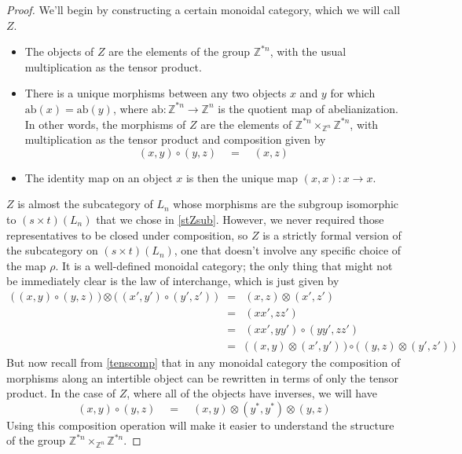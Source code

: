 \documentclass{amsbook} %
\numberwithin{section}{chapter}
\begin{document}
\begin{proof}
We'll begin by constructing a certain monoidal category, which we will call $Z$. 
\begin{itemize}
\item The objects of $Z$ are the elements of the group $\mathbb{Z}^{\ast n}$, with the usual multiplication as the tensor product.
\item There is a unique morphisms between any two objects $x$ and $y$ for which $\mathrm{ab}(x) = \mathrm{ab}(y)$, where $\mathrm{ab}: \mathbb{Z}^{\ast n} \to \mathbb{Z}^n$ is the quotient map of abelianization. In other words, the morphisms of $Z$ are the elements of $\mathbb{Z}^{\ast n} \times_{\mathbb{Z}^n} \mathbb{Z}^{\ast n}$, with multiplication as the tensor product and composition given by
\[ (x,y) \circ (y,z) \quad = \quad (x, z) \]
\item The identity map on an object $x$ is then the unique map $(x,x) : x \to x$.
\end{itemize}
$Z$ is almost the subcategory of $L_n$ whose morphisms are the subgroup isomorphic to $(s \times t)(L_n)$ that we chose in \cref{stZsub}. However, we never required those representatives to be closed under composition, so $Z$ is a strictly formal version of the subcategory on $(s \times t)(L_n)$, one that doesn't involve any specific choice of the map $\rho$. It is a well-defined monoidal category; the only thing that might not be immediately clear is the law of interchange, which is just given by
\[ \begin{array}{rll}
			\big( \, (x,y) \circ (y,z) \, \big) \otimes \big( \, (x',y') \circ (y',z') \, \big) & = & (x,z) \otimes (x',z') \\
			& = & (xx',zz') \\
			& = & (xx',yy') \circ (yy',zz') \\
			& = & \big( \, (x,y) \otimes (x',y') \, \big) \circ \big( \, (y,z) \otimes (y',z') \, \big) 
		\end{array}
\]
But now recall from \cref{tenscomp} that in any monoidal category the composition of morphisms along an intertible object can be rewritten in terms of only the tensor product. In the case of $Z$, where all of the objects have inverses, we will have
\[ (x,y) \circ (y, z) \quad = \quad (x, y) \otimes (y^*, y^*) \otimes (y, z) \]
Using this composition operation will make it easier to understand the structure of the group $\mathbb{Z}^{\ast n} \times_{\mathbb{Z}^n} \mathbb{Z}^{\ast n}$.


\end{proof}
\end{document}
